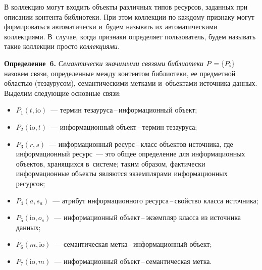 \begin{multicols}{2}
В коллекцию могут входить объекты различных типов ресурсов, заданных 
при описании контента биб\-лио\-те\-ки. При этом коллекции по каждому 
признаку могут формироваться автоматически и~будем называть их 
автоматическими коллекциями. В~случае, когда признаки определяет 
пользователь, будем называть такие коллекции просто \textit{коллекциями.}

\smallskip

\noindent
\textbf{Определение~6.} \textit{Семантически значимыми связями 
библиотеки} $P\hm=\left\{P_i\right\}$ назовем связи, определенные между 
контентом библиотеки, ее предметной об\-ластью (тезаурусом), 
семантическими метками и~объектами источника данных. Выделим 
сле\-ду\-ющие основные связи:
\begin{itemize}
\item $P_1(t, \mathrm{io})$~--- термин те\-за\-у\-ру\-са\,--\,ин\-фор\-ма\-ци\-он\-ный 
объект;
\item $P_2(\mathrm{io}, t)$~--- информационный объ\-ект\,--\,тер\-мин тезауруса;
\item $P_3(r, s)$~--- информационный ре\-сурс\,--\,класс объектов 
источника, где информационный ресурс~--- это общее определение для 
информационных объектов, хранящихся в~сис\-те\-ме; таким образом, 
фактически информационные объекты являются экземплярами 
информационных ресурсов;
\item $P_4(a, s_a)$~--- атрибут информационного ре\-сур\-са\,--\,свой\-ст\-во 
класса источника;
\item $P_5(\mathrm{io}, o_s)$~--- информационный объ\-ект\,--\,эк\-земп\-ляр класса из 
источника данных;
\item $P_6(m, \mathrm{io})$~--- семантическая мет\-ка\,--\,ин\-фор\-ма\-ци\-он\-ный 
объект;
\item $P_7(\mathrm{io}, m)$~--- информационный объ\-ект\,--\,се\-ман\-ти\-че\-ская 
метка.
\end{itemize}


\end{multicols}

